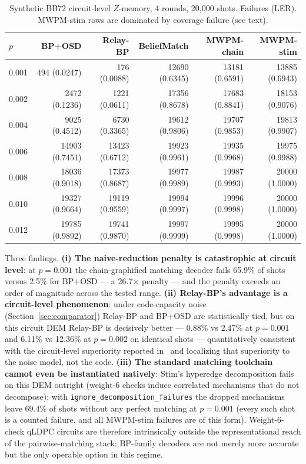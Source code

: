 \documentclass[11pt,a4paper]{article}
\begin{document}
\begin{table}[H]\centering\small
\caption{Synthetic BB72 circuit-level $Z$-memory, 4 rounds, 20{,}000 shots.
  Failures (LER). MWPM-stim rows are dominated by coverage failure (see text).}
\label{tab:wsc}
\begin{tabular}{@{}lrrrrr@{}}
\toprule
$p$ & BP+OSD & Relay-BP & BeliefMatch & MWPM-chain & MWPM-stim \\
\midrule
0.001 & 494 (0.0247) & 176 (0.0088) & 12690 (0.6345) & 13181 (0.6591) & 13885 (0.6943) \\
0.002 & 2472 (0.1236) & 1221 (0.0611) & 17356 (0.8678) & 17683 (0.8841) & 18153 (0.9076) \\
0.004 & 9025 (0.4512) & 6730 (0.3365) & 19612 (0.9806) & 19707 (0.9853) & 19813 (0.9907) \\
0.006 & 14903 (0.7451) & 13423 (0.6712) & 19923 (0.9961) & 19935 (0.9968) & 19975 (0.9988) \\
0.008 & 18036 (0.9018) & 17373 (0.8687) & 19977 (0.9989) & 19987 (0.9993) & 20000 (1.0000) \\
0.010 & 19327 (0.9664) & 19119 (0.9559) & 19994 (0.9997) & 19996 (0.9998) & 20000 (1.0000) \\
0.012 & 19785 (0.9892) & 19741 (0.9870) & 19997 (0.9999) & 19995 (0.9998) & 20000 (1.0000) \\
\bottomrule
\end{tabular}
\end{table}

Three findings. \textbf{(i) The naive-reduction penalty is catastrophic at
circuit level}: at $p=0.001$ the chain-graphified matching decoder fails
65.9\% of shots versus 2.5\% for BP+OSD --- a 26.7$\times$ penalty ---
and the penalty exceeds an order of magnitude across the tested range.
\textbf{(ii) Relay-BP's advantage is a circuit-level phenomenon}: under
code-capacity noise (Section~\ref{sec:comparator}) Relay-BP and BP+OSD are
statistically tied, but on this circuit DEM Relay-BP is decisively better ---
0.88\% vs 2.47\% at $p=0.001$ and 6.11\% vs 12.36\% at $p=0.002$ on
identical shots --- quantitatively consistent with the circuit-level
superiority reported in~\cite{Muller2025relay} and localizing that
superiority to the noise model, not the code. \textbf{(iii) The standard
matching toolchain cannot even be instantiated natively}: Stim's hyperedge
decomposition fails on this DEM outright (weight-6 checks induce correlated
mechanisms that do not decompose); with
\texttt{ignore\_decomposition\_failures} the dropped mechanisms leave
69.4\% of shots without any perfect matching at $p=0.001$ (every such shot
is a counted failure, and all MWPM-stim failures are of this form).
Weight-6-check qLDPC circuits are therefore intrinsically outside the
representational reach of the pairwise-matching stack: BP-family decoders are
not merely more accurate but the only operable option in this regime.
\end{document}
